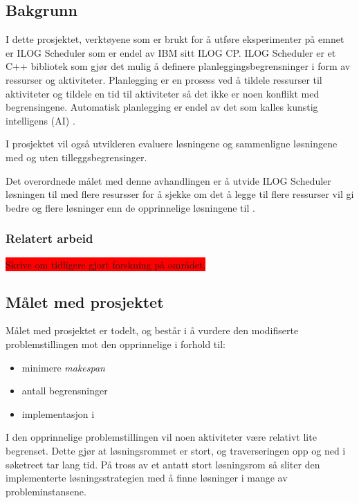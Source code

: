 \subsection{Bakgrunn}
I dette prosjektet, verktøyene som er brukt for å utføre eksperimenter på emnet er ILOG Scheduler som er endel av IBM sitt ILOG CP. ILOG Scheduler er et C++ bibliotek som gjør det mulig å definere planleggingsbegrensninger i form av ressurser og aktiviteter. Planlegging er en prosess ved å tildele ressurser til aktiviteter og tildele en tid til aktiviteter så det ikke er noen konflikt med begrensingene.\cite{Pape94implementationof} Automatisk planlegging er endel av det som kalles kunstig intelligens (AI) .

I prosjektet vil også utvikleren evaluere løsningene og sammenligne løsningene med og uten tilleggsbegrensinger.

Det overordnede målet med denne avhandlingen er å utvide ILOG Scheduler løsningen til \bht med flere resursser for å sjekke om det å legge til flere ressurser vil gi bedre og flere løsninger enn de opprinnelige løsningene til \bht.

\subsubsection{Relatert arbeid}
\colorbox{red}{Skrive om tidligere gjort forskning på området.}

\subsection{Målet med prosjektet}
Målet med prosjektet er todelt, og består i å vurdere den modifiserte problemstillingen mot den opprinnelige i forhold til:
\begin{itemize}
\item minimere \textit{makespan}
\item antall begrensninger
\item implementasjon i \ilog
\end{itemize}

I den opprinnelige problemstillingen vil noen aktiviteter være relativt lite begrenset. Dette gjør at løsningsrommet er stort, og traverseringen opp og ned i søketreet tar lang tid. På tross av et antatt stort løsningsrom så sliter den \ilog implementerte løsningsstrategien med å finne løsninger i mange av probleminstansene.


